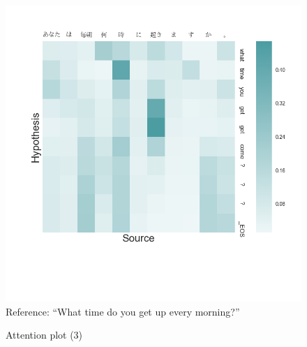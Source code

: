 \documentclass[answers]{exam}
\begin{document}
\begin{CJK}{UTF8}{min}
\begin{figure}
  \centering
  \includegraphics[width=\linewidth]{fig-plot-3}
  Reference: ``What time do you get up every morning?''
  \caption{Attention plot (3)}
  \label{fig:plot-3}
\end{figure}


\end{CJK}
\end{document}
